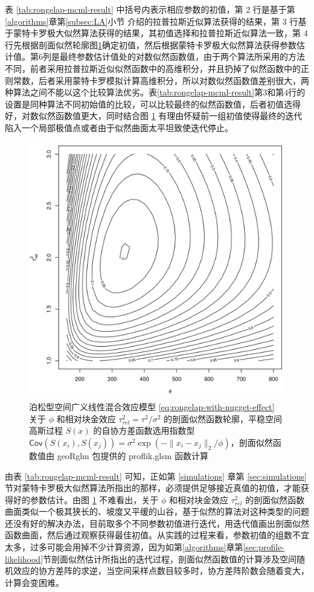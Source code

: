 \documentclass[12pt,a4paper,UTF8,twoside]{book}
\theoremstyle{definition}
\theoremstyle{definition}
\theoremstyle{definition}
\theoremstyle{remark}
\begin{document}
表 \ref{tab:rongelap-mcml-result} 中括号内表示相应参数的初值，第 2
行是基于第\ref{algorithms}章第\ref{subsec:LA}小节
介绍的拉普拉斯近似算法获得的结果，第 3
行基于蒙特卡罗极大似然算法获得的结果，其初值选择和拉普拉斯近似算法一致，第
4
行先根据剖面似然轮廓图\ref{fig:profile-phi-tausq}确定初值，然后根据蒙特卡罗极大似然算法获得参数估计值。第6列是最终参数估计值处的对数似然函数值，由于两个算法所采用的方法不同，前者采用拉普拉斯近似似然函数中的高维积分，并且扔掉了似然函数中的正则常数，后者采用蒙特卡罗模拟计算高维积分，所以对数似然函数值差别很大，两种算法之间不能以这个比较算法优劣。表\ref{tab:rongelap-mcml-result}第3和第4行的设置是同种算法不同初始值的比较，可以比较最终的似然函数值，后者初值选得好，对数似然函数值更大，同时结合图
\ref{fig:profile-phi-tausq}
有理由怀疑前一组初值使得最终的迭代陷入一个局部极值点或者由于似然曲面太平坦致使迭代停止。

\begin{figure}[!htb]

{\centering \includegraphics[width=0.65\linewidth]{figures/profile-phitausq} 

}

\caption{泊松型空间广义线性混合效应模型
\eqref{eq:rongelap-with-nugget-effect} 关于 \(\phi\) 和相对块金效应
\(\tau^2_{rel} = \tau^2 / \sigma^2\)
的剖面似然函数轮廓，平稳空间高斯过程 \(S(x)\) 的自协方差函数选用指数型
\(\mathsf{Cov}( S(x_i), S(x_j) ) = \sigma^2 \exp( -\|x_i -x_j\|_{2} / \phi )\)，剖面似然函数值由
geoRglm 包提供的 proflik.glsm 函数计算}\label{fig:profile-phi-tausq}
\end{figure}

由表 \ref{tab:rongelap-mcml-result} 可知，正如第 \ref{simulations} 章第
\ref{sec:simulations}
节对蒙特卡罗极大似然算法所指出的那样，必须提供足够接近真值的初值，才能获得好的参数估计。由图
\ref{fig:profile-phi-tausq} 不难看出，关于 \(\phi\) 和相对块金效应
\(\tau^2_{rel}\)
的剖面似然函数曲面类似一个极其狭长的、坡度又平缓的山谷，基于似然的算法对这种类型的问题还没有好的解决办法，目前取多个不同参数初值进行迭代，用迭代值画出剖面似然函数曲面，然后通过观察获得最佳初值。从实践的过程来看，参数初值的组数不宜太多，过多可能会用掉不少计算资源，因为如第\ref{algorithms}章第\ref{sec:profile-likelihood}节剖面似然估计所指出的迭代过程，剖面似然函数值的计算涉及空间随机效应的协方差阵的求逆，当空间采样点数目较多时，协方差阵阶数会随着变大，计算会变困难。
\end{document}
